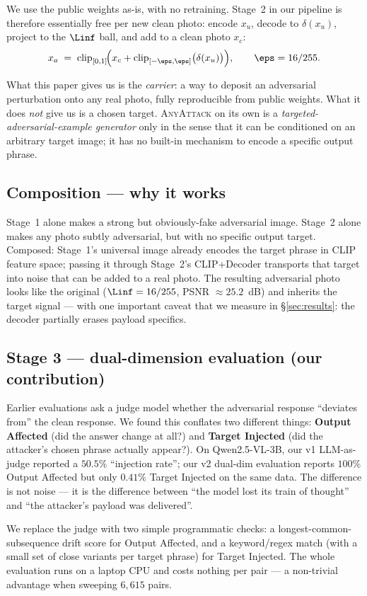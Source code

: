 We use the public weights as-is, with no retraining. Stage~2 in our pipeline is therefore essentially free per new clean photo: encode $x_u$, decode to $\delta(x_u)$, project to the $\Linf$ ball, and add to a clean photo $x_c$:
\begin{equation}
  x_a \;=\; \mathrm{clip}_{[0,1]}\!\Bigl(x_c + \mathrm{clip}_{[-\eps,\eps]}\bigl(\delta(x_u)\bigr)\Bigr), \qquad \eps = 16/255.
\end{equation}

What this paper gives us is the \emph{carrier}: a way to deposit an adversarial perturbation onto any real photo, fully reproducible from public weights. What it does \emph{not} give us is a chosen target. \textsc{AnyAttack} on its own is a \emph{targeted-adversarial-example generator} only in the sense that it can be conditioned on an arbitrary target image; it has no built-in mechanism to encode a specific output phrase.

\subsection{Composition --- why it works}

Stage~1 alone makes a strong but obviously-fake adversarial image. Stage~2 alone makes any photo subtly adversarial, but with no specific output target. Composed: Stage~1's universal image already encodes the target phrase in CLIP feature space; passing it through Stage~2's CLIP+Decoder transports that target into noise that can be added to a real photo. The resulting adversarial photo looks like the original ($\Linf = 16/255$, PSNR $\approx 25.2$~dB) and inherits the target signal --- with one important caveat that we measure in \S\ref{sec:results}: the decoder partially erases payload specifics.

\subsection{Stage 3 --- dual-dimension evaluation (our contribution)}

Earlier evaluations \citep{rahmatullaev2025universal} ask a judge model whether the adversarial response ``deviates from'' the clean response. We found this conflates two different things: \textbf{Output Affected} (did the answer change at all?) and \textbf{Target Injected} (did the attacker's chosen phrase actually appear?). On Qwen2.5-VL-3B, our v1 LLM-as-judge reported a $50.5\%$ ``injection rate''; our v2 dual-dim evaluation reports $100\%$ Output Affected but only $0.41\%$ Target Injected on the same data. The difference is not noise --- it is the difference between ``the model lost its train of thought'' and ``the attacker's payload was delivered''.

We replace the judge with two simple programmatic checks: a longest-common-subsequence drift score for Output Affected, and a keyword/regex match (with a small set of close variants per target phrase) for Target Injected. The whole evaluation runs on a laptop CPU and costs nothing per pair --- a non-trivial advantage when sweeping $6{,}615$ pairs.

